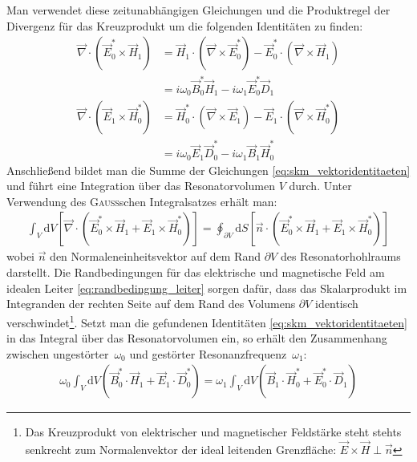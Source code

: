 \documentclass[11pt, a4paper]{scrbook}
\newcommand{\vnabla}{\vec{\nabla}}
\newcommand{\ve}{\vec{E}}
\newcommand{\vb}{\vec{B}}
\newcommand{\vh}{\vec{H}}
\newcommand{\vd}{\vec{D}}
\begin{document}
	Man verwendet diese zeitunabhängigen Gleichungen und die Produktregel der Divergenz für das Kreuzprodukt um die folgenden Identitäten zu finden:
	\begin{subequations}
		\label{eq:skm_vektoridentitaeten}
		\begin{align}
		\vnabla \cdot \left( \ve_0^* \times \vh_1\right) &= \vh_1 \cdot \left( \vnabla \times \ve_0^* \right) - \ve_0^* \cdot \left( \vnabla \times \vh_1 \right) \nonumber \\
		&= i \omega_0 \vb_0^* \vh_1 - i \omega_1 \ve_0^* \vd_1 \label{eq:e0h1} \\[0.5em]
		\vnabla \cdot \left( \ve_1 \times \vh_0^* \right) &= \vh_0^* \cdot \left( \vnabla \times \ve_1 \right) - \ve_1 \cdot \left( \vnabla \times \vh_0^* \right) \nonumber \\
		&= i \omega_0 \ve_1 \vd_0^* - i \omega_1 \vb_1 \vh_0^* \label{eq:e1h0}
		\end{align}
	\end{subequations}
	Anschließend bildet man die Summe der Gleichungen \eqref{eq:skm_vektoridentitaeten} und führt eine Integration über das Resonatorvolumen $V$ durch.
	Unter Verwendung des \textsc{Gauß}schen Integralsatzes erhält man:
	\begin{align}
		\int_{V} \mathrm{d}V \left[ \vnabla \cdot \left( \ve_0^* \times \vh_1 + \ve_1 \times \vh_0^* \right) \right] = \oint_{\partial V} \mathrm{d}S \left[ \vec{n} \cdot \left( \ve_0^* \times \vh_1 + \ve_1 \times \vh_0^* \right)\right] \label{eq:volint}
	\end{align}
	wobei $\vec{n}$ den Normaleneinheitsvektor auf dem Rand $\partial V$ des Resonatorhohlraums darstellt.
	Die Randbedingungen für das elektrische und magnetische Feld am idealen Leiter \eqref{eq:randbedingung_leiter} sorgen dafür, dass das Skalarprodukt im Integranden der rechten Seite auf dem Rand des Volumens $\partial V$ identisch verschwindet\footnote{Das Kreuzprodukt von elektrischer und magnetischer Feldstärke steht stehts senkrecht zum Normalenvektor der ideal leitenden Grenzfläche: $\ve \times \vh \perp \vec{n}$}.
	Setzt man die gefundenen Identitäten \eqref{eq:skm_vektoridentitaeten} in das Integral über das Resonatorvolumen ein, so erhält den Zusammenhang zwischen ungestörter~$\omega_0$ und gestörter Resonanzfrequenz~$\omega_1$:
	\begin{align}
		\omega_0 \int_{V} \mathrm{d}V \left( \vb_0^* \cdot \vh_1 + \ve_1 \cdot \vd_0^* \right) = \omega_1 \int_{V} \mathrm{d}V \left( \vb_1 \cdot \vh_0^* + \ve_0^* \cdot \vd_1 \right)
	\end{align}
\end{document}
